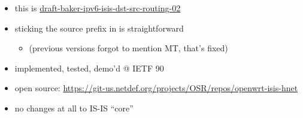 \documentclass[12pt]{beamer}
\begin{document}
\begin{frame}
  \vspace{6mm}
  \begin{itemize}
    \item this is \href{https://datatracker.ietf.org/doc/draft-baker-ipv6-isis-dst-src-routing/}{draft-baker-ipv6-isis-dst-src-routing-02}
    \item sticking the source prefix in is straightforward
    \begin{itemize}
      \item (previous versions forgot to mention MT, that's fixed)
    \end{itemize}
    \item implemented, tested, demo'd @ IETF 90
    \item open source: \url{https://git-us.netdef.org/projects/OSR/repos/openwrt-isis-hnet}
    \item no changes at all to IS-IS ``core''
  \end{itemize}
\end{frame}
\end{document}
